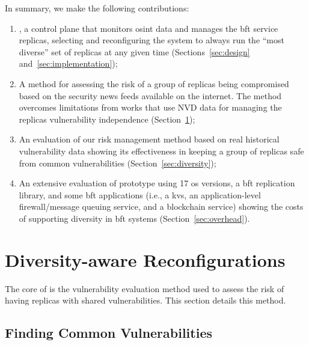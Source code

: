 In summary, we make the following contributions: 

\begin{enumerate}

\item \system, a control plane that monitors \gls{osint} data and manages the \gls{bft} service replicas, selecting and reconfiguring the system to always run the ``most diverse'' set of replicas at any given time (Sections~\ref{sec:design} and~\ref{sec:implementation});

\item A method for assessing the risk of a group of replicas being compromised based on the security news feeds available on the internet. 
The method overcomes limitations from works that use NVD data for managing the replicas vulnerability independence (Section~\ref{sec:metric});

\item An evaluation of our risk management method based on real historical vulnerability data showing its effectiveness in keeping a group of replicas safe from common vulnerabilities (Section~\ref{sec:diversity});

\item An extensive evaluation of \system prototype using 17 \gls{os} versions, a \gls{bft} replication library, and some \gls{bft} applications (i.e., a \gls{kvs}, an application-level firewall/message queuing service, and a blockchain service) showing the costs of supporting diversity in \gls{bft} systems (Section~\ref{sec:overhead}).

\end{enumerate}


\section{Diversity-aware Reconfigurations}
\label{sec:metric}

The core of \system is the vulnerability evaluation method used to assess the risk of having replicas with shared vulnerabilities.
This section details this method.

\subsection*{Finding Common Vulnerabilities}

